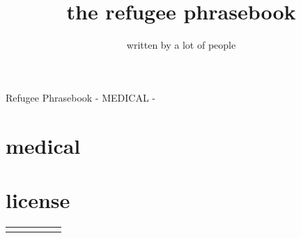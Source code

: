\documentclass[ %
	11pt, %
	paper=a4,
	landscape,
	abstract=on,
	version=last]{scrartcl}
\author{written by a lot of people}
\title{the refugee phrasebook}
\begin{document}
{\Large Refugee Phrasebook - MEDICAL - }
\section*{medical}



\section*{license}
 \newline


\begin{longtabu}{X[l] X[r] X[l] X[r] X[l] }
\everyrow {\tabucline[ on 1 pt ] - }
\toprule

\midrule
\endhead

\end{longtabu}
\end{document}
